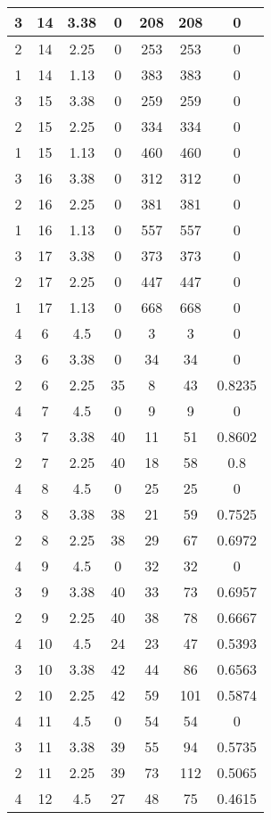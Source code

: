 \documentclass[letterpaper, 12pt]{article}
\begin{document}
\begin{longtable}{|c|c|c|c|c|c|c|}
\hline
3 & 14 & 3.38 & 0 & 208 & 208 & 0 \\
\hline
2 & 14 & 2.25 & 0 & 253 & 253 & 0 \\
\hline
1 & 14 & 1.13 & 0 & 383 & 383 & 0 \\
\hline
3 & 15 & 3.38 & 0 & 259 & 259 & 0 \\
\hline
2 & 15 & 2.25 & 0 & 334 & 334 & 0 \\
\hline
1 & 15 & 1.13 & 0 & 460 & 460 & 0 \\
\hline
3 & 16 & 3.38 & 0 & 312 & 312 & 0 \\
\hline
2 & 16 & 2.25 & 0 & 381 & 381 & 0 \\
\hline
1 & 16 & 1.13 & 0 & 557 & 557 & 0 \\
\hline
3 & 17 & 3.38 & 0 & 373 & 373 & 0 \\
\hline
2 & 17 & 2.25 & 0 & 447 & 447 & 0 \\
\hline
1 & 17 & 1.13 & 0 & 668 & 668 & 0 \\
\hline
4 & 6 & 4.5 & 0 & 3 & 3 & 0 \\
\hline
3 & 6 & 3.38 & 0 & 34 & 34 & 0 \\
\hline
2 & 6 & 2.25 & 35 & 8 & 43 & 0.8235 \\
\hline
4 & 7 & 4.5 & 0 & 9 & 9 & 0 \\
\hline
3 & 7 & 3.38 & 40 & 11 & 51 & 0.8602 \\
\hline
2 & 7 & 2.25 & 40 & 18 & 58 & 0.8 \\
\hline
4 & 8 & 4.5 & 0 & 25 & 25 & 0 \\
\hline
3 & 8 & 3.38 & 38 & 21 & 59 & 0.7525 \\
\hline
2 & 8 & 2.25 & 38 & 29 & 67 & 0.6972 \\
\hline
4 & 9 & 4.5 & 0 & 32 & 32 & 0 \\
\hline
3 & 9 & 3.38 & 40 & 33 & 73 & 0.6957 \\
\hline
2 & 9 & 2.25 & 40 & 38 & 78 & 0.6667 \\
\hline
4 & 10 & 4.5 & 24 & 23 & 47 & 0.5393 \\
\hline
3 & 10 & 3.38 & 42 & 44 & 86 & 0.6563 \\
\hline
2 & 10 & 2.25 & 42 & 59 & 101 & 0.5874 \\
\hline
4 & 11 & 4.5 & 0 & 54 & 54 & 0 \\
\hline
3 & 11 & 3.38 & 39 & 55 & 94 & 0.5735 \\
\hline
2 & 11 & 2.25 & 39 & 73 & 112 & 0.5065 \\
\hline
4 & 12 & 4.5 & 27 & 48 & 75 & 0.4615 \\

\end{longtable}
\end{document}
